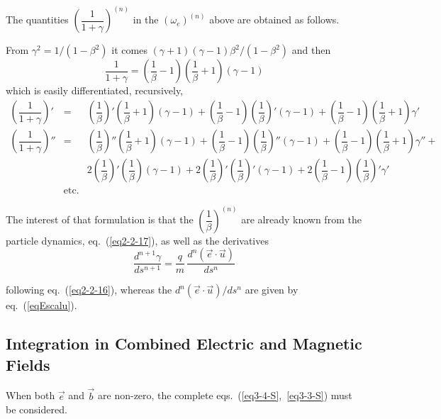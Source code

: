 \noindent  The quantities $ \left( \dfrac{1}{1+\gamma} \right)^{(n)}$  in the $(\omega_e)^{(n)}$ above 
are obtained as follows. 

\noindent From $\gamma^2 = 1/(1-\beta^2)$ it comes $(\gamma+1)(\gamma-1) \beta^2/(1-\beta^2)$ and then
$$\dfrac{1}{1+\gamma} = \left( \dfrac{1}{\beta} -1 \right) \left( \dfrac{1}{\beta} +1 \right) (\gamma-1)$$
which is easily differentiated, recursively, 
\begin{equation}
	\begin{array}{lcc}
\left( \dfrac{1}{1+\gamma}\right)' &= &
\left( \dfrac{1}{\beta} \right)' \left( \dfrac{1}{\beta} +1 \right) (\gamma-1)  +
\left( \dfrac{1}{\beta} -1 \right) \left( \dfrac{1}{\beta} \right)' (\gamma-1) + 
\left( \dfrac{1}{\beta} -1 \right) \left( \dfrac{1}{\beta} +1 \right) \gamma' \\
\left( \dfrac{1}{1+\gamma}\right)'' &= &
\left( \dfrac{1}{\beta} \right)'' \left( \dfrac{1}{\beta} +1 \right) (\gamma-1)  +
\left( \dfrac{1}{\beta} -1 \right) \left( \dfrac{1}{\beta} \right)'' (\gamma-1) + 
\left( \dfrac{1}{\beta} -1 \right) \left( \dfrac{1}{\beta} +1 \right) \gamma''  +\\
&& 2 \left( \dfrac{1}{\beta} \right)' \left( \dfrac{1}{\beta}\right) (\gamma-1)  + 
2 \left( \dfrac{1}{\beta}  \right)' \left( \dfrac{1}{\beta} \right)' (\gamma-1) + 
 2 \left( \dfrac{1}{\beta} -1 \right) \left( \dfrac{1}{\beta} \right)' \gamma' \\
              &  \textrm{etc.}
	\end{array}
	\label{eqGamma-E}
\end{equation} 

\noindent The interest of that formulation is that the $\left( \dfrac{1}{\beta} \right)^{(n)}$ are already known from the particle dynamics, eq.~(\ref{eq2-2-17}), 
as well as the derivatives 
$$	\dfrac{ d^{n+1} \gamma }{ds^{n+1}} = \dfrac{q}{m} \, \dfrac{ d^n (\vec  e\cdot\vec  u) }{ ds^n}$$

\noindent following eq.~(\ref{eq2-2-16}), whereas the $d^n (\vec  e\cdot\vec  u)/ ds^n$ are given by eq.~(\ref{eqEscalu}).


 \subsection{Integration in Combined Electric and Magnetic Fields} \label{sec2.2.3-S}%

 When both $ \vec  e $ and $ \vec  b $ are non-zero, the complete 
 eqs.~(\ref{eq3-4-S},~\ref{eq3-3-S}) must be considered. 

